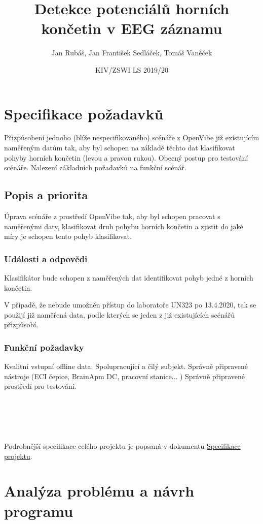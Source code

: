 \documentclass{report}
\title{Detekce potenciálů horních končetin v EEG záznamu}
\author{Jan Rubáš, Jan František Sedláček, Tomáš Vaněček}
\date{KIV/ZSWI LS 2019/20}
\begin{document}
\maketitle
\tableofcontents
%
\chapter{Specifikace požadavků}
Přizpůsobení jednoho (blíže nespecifikovaného) scénáře z OpenVibe již existujícím naměřeným datům tak, aby byl schopen na základě těchto dat klasifikovat pohyby horních končetin (levou a pravou rukou).
Obecný postup pro testování scénáře.
Nalezení základních požadavků na funkční scénář.

\section{Popis a priorita}
Úprava scénáře z prostředí OpenVibe tak, aby byl schopen pracovat s naměřenými daty, klasifikovat druh pohybu horních končetin a zjistit do jaké míry je schopen tento pohyb klasifikovat.

\subsection{Události a odpovědi}
Klasifikátor bude schopen z naměřených dat identifikovat pohyb jedné z horních končetin.

V případě, že nebude umožněn přístup do laboratoře UN323 po 13.4.2020, tak se použijí již naměřená data, podle kterých se jeden z již existujících scénářů přizpůsobí.

\subsection{Funkční požadavky}
Kvalitní vstupní offline data:
Spolupracující a čilý subjekt.
Správně připravené nástroje (ECI čepice, BrainApm DC, pracovní stanice... )
Správně připravené prostředí pro testování.
\\
\\
\\
\\
\\
\\
Podrobnější specifikace celého projektu je popsaná v dokumentu
\href{https://docs.google.com/document/d/1LbMN5tFxxpSZ1Gf7irw77nM88PaOCfTKEih6rNO8mn0/edit?usp=sharing}{Specifikace projektu}.


\chapter{Analýza problému a návrh programu}
%
\end{document}
